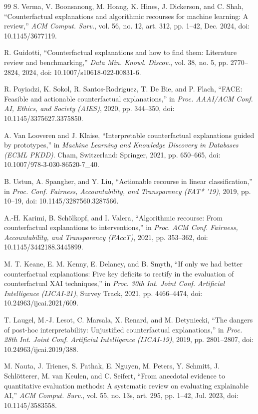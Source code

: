 \documentclass[11pt,a4paper]{article}
\begin{document}
\begin{thebibliography}{99}
 S. Verma, V. Boonsanong, M. Hoang, K. Hines, J. Dickerson, and C. Shah, ``Counterfactual explanations and algorithmic recourses for machine learning: A review,'' \emph{ACM Comput. Surv.}, vol. 56, no. 12, art. 312, pp. 1--42, Dec. 2024, doi: 10.1145/3677119.

 R. Guidotti, ``Counterfactual explanations and how to find them: Literature review and benchmarking,'' \emph{Data Min. Knowl. Discov.}, vol. 38, no. 5, pp. 2770--2824, 2024, doi: 10.1007/s10618-022-00831-6.

 R. Poyiadzi, K. Sokol, R. Santos-Rodriguez, T. De Bie, and P. Flach, ``FACE: Feasible and actionable counterfactual explanations,'' in \emph{Proc. AAAI/ACM Conf. AI, Ethics, and Society (AIES)}, 2020, pp. 344--350, doi: 10.1145/3375627.3375850.

 A. Van Looveren and J. Klaise, ``Interpretable counterfactual explanations guided by prototypes,'' in \emph{Machine Learning and Knowledge Discovery in Databases (ECML PKDD)}. Cham, Switzerland: Springer, 2021, pp. 650--665, doi: 10.1007/978-3-030-86520-7\_40.

 B. Ustun, A. Spangher, and Y. Liu, ``Actionable recourse in linear classification,'' in \emph{Proc. Conf. Fairness, Accountability, and Transparency (FAT* '19)}, 2019, pp. 10--19, doi: 10.1145/3287560.3287566.

 A.-H. Karimi, B. Sch\"{o}lkopf, and I. Valera, ``Algorithmic recourse: From counterfactual explanations to interventions,'' in \emph{Proc. ACM Conf. Fairness, Accountability, and Transparency (FAccT)}, 2021, pp. 353--362, doi: 10.1145/3442188.3445899.

 M. T. Keane, E. M. Kenny, E. Delaney, and B. Smyth, ``If only we had better counterfactual explanations: Five key deficits to rectify in the evaluation of counterfactual XAI techniques,'' in \emph{Proc. 30th Int. Joint Conf. Artificial Intelligence (IJCAI-21)}, Survey Track, 2021, pp. 4466--4474, doi: 10.24963/ijcai.2021/609.

 T. Laugel, M.-J. Lesot, C. Marsala, X. Renard, and M. Detyniecki, ``The dangers of post-hoc interpretability: Unjustified counterfactual explanations,'' in \emph{Proc. 28th Int. Joint Conf. Artificial Intelligence (IJCAI-19)}, 2019, pp. 2801--2807, doi: 10.24963/ijcai.2019/388.

 M. Nauta, J. Trienes, S. Pathak, E. Nguyen, M. Peters, Y. Schmitt, J. Schl\"{o}tterer, M. van Keulen, and C. Seifert, ``From anecdotal evidence to quantitative evaluation methods: A systematic review on evaluating explainable AI,'' \emph{ACM Comput. Surv.}, vol. 55, no. 13s, art. 295, pp. 1--42, Jul. 2023, doi: 10.1145/3583558.


\end{thebibliography}
\end{document}
